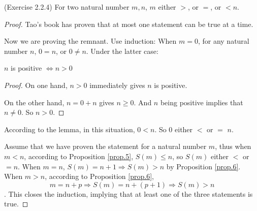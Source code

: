 \begin{prop}
(Exercise 2.2.4) \label{exercise2.2.4}
For two natural number $m,n$, $m$ either $>$, or $=$, or $<n$.
\end{prop}
\begin{proof}
Tao's book has proven that at most one statement can be true at a time.

Now we are proving the remnant. Use induction: When $m=0$, for any natural number $n$, 
$0=n$, or $0 \neq n$. Under the latter case:
\begin{lem}
$n$ is positive $\Longleftrightarrow n>0$
\end{lem}
\begin{proof}
On one hand, $n>0$ immediately gives $n$ is positive.

On the other hand, $n=0+n$ gives $n \geq 0$. And $n$ being positive implies that $n \neq 0$. 
So $n > 0$.
\end{proof}

According to the lemma, in this situation, $0<n$. So 0 either $<$ or $=$ $n$.

Assume that we have proven the statement for a natural number $m$, thus when $m<n$, according to 
Proposition \ref{prop.5}, $S(m) \leq n$, so $S(m)$ either $<$ or $=n$. When $m=n$, 
$S(m)=n+1 \Longrightarrow S(m) > n$ by Proposition \ref{prop.6}. When $m>n$, according to Proposition 
\ref{prop.6}, 
\[
m=n+p \Longrightarrow S(m)=n+(p+1) \Longrightarrow S(m)>n
\]. This closes the induction, implying that at least one of the three statements is true.
\end{proof}

